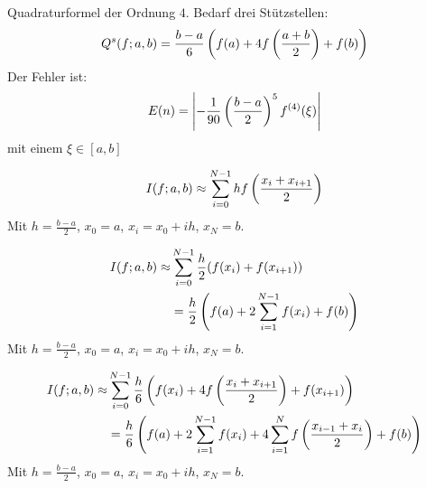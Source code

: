  {
    
    Quadraturformel der Ordnung $4$. Bedarf drei Stützstellen:
    \begin{align*}
        Q^s (f;a,b) = \frac{b-a}{6} \left( f(a)+4 f\left( \frac{a+b}{2} \right) + f(b) \right)
    \end{align*}
    Der Fehler ist:
    \begin{align*}
        E(n) = \left\vert -\frac{1}{90} \left( \frac{b-a}{2} \right)^5 f^{(4)} (\xi) \right\vert
    \end{align*}
    mit einem $\xi \in [a,b]$
}

\vspace{1\baselineskip}

 {
    \begin{align*}
        I(f;a,b) \approx \sum_{i=0}^{N-1} h f \left( \frac{x_i + x_{i+1}}{2} \right)
    \end{align*}
    Mit $h=\frac{b-a}{2}$, $x_0 = a$, $x_i = x_0 + i h$, $x_N = b$.
}

\vspace{1\baselineskip}

 {
    \begin{align*}
        I(f;a,b) \approx& \sum_{i=0}^{N-1} \frac{h}{2} (f(x_i) + f(x_{i+1})) \\
        &= \frac{h}{2} \left( f(a) + 2 \sum_{i=1}^{N-1} f(x_i) + f(b) \right)
    \end{align*}
    Mit $h=\frac{b-a}{2}$, $x_0 = a$, $x_i = x_0 + i h$, $x_N = b$.
}

\vspace{1\baselineskip}

 {
    \begin{align*}
        I(f;a,b) \approx& \sum_{i=0}^{N-1} \frac{h}{6} \left( f(x_i) +
            4 f\left( \frac{x_i + x_{i+1}}{2} \right) + f(x_{i+1}) \right)
        \\
        &=\frac{h}{6} \left( f(a) + 2 \sum_{i=1}^{N-1} f(x_i) + 4 \sum_{i=1}^N f \left( \frac{x_{i-1} + x_i}{2} \right) + f(b) \right)
    \end{align*}
    Mit $h=\frac{b-a}{2}$, $x_0 = a$, $x_i = x_0 + i h$, $x_N = b$.
}

\vspace{1\baselineskip}

